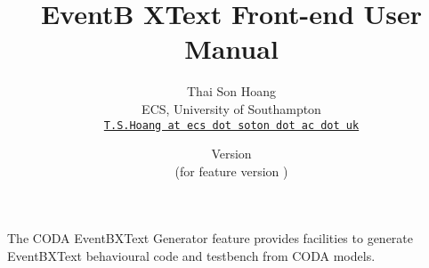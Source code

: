 \documentclass[a4paper,10pt]{article}
\title{EventB XText Front-end User Manual}
\author{%
  Thai Son Hoang\\%
  ECS, University of Southampton\\%
  \texttt{\href{mailto:T.S.Hoang@ecs.soton.ac.uk}{T.S.Hoang at ecs dot soton dot ac dot uk}}%
}%
\date{%
  Version \EventBXTextManualVersion\\%
  (for feature version \EventBXTextFeatureVersion)\\
  \ifplastex
  \EventBXTextManualDate
  \else
  \displaydate{EventBXTextManualDate}%
  \fi
}
\begin{document}
\ifplastex%
\maketitle%
\else%
 \ifstandalone%
 \maketitle %
 \else%
 \fi%
\fi%

The CODA EventBXText Generator feature provides facilities to generate EventBXText behavioural code and testbench from CODA models. 












\end{document}
